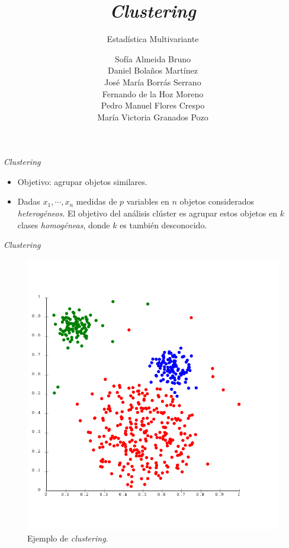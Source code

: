 \documentclass[spanish]{beamer}
\title{\textit{Clustering}}
\subtitle{Estadística Multivariante}
\author{Sofía Almeida Bruno\\ Daniel Bolaños Martínez\\ José María Borrás Serrano\\ Fernando de la Hoz Moreno\\ Pedro Manuel Flores Crespo\\ María Victoria Granados Pozo}
\begin{document}
\maketitle
	
\begin{frame}{\textit{Clustering}}
  \begin{itemize}
  \item Objetivo: agrupar objetos similares.\break
  \item Dadas \textbf{$x_1$}$,\cdots, $\textbf{$x_n$} medidas de $p$ variables en $n$ objetos considerados \textit{heterogéneos}. El objetivo del análisis clúster es agrupar estos objetos en $k$ clases \textit{homogéneas}, donde $k$ es también desconocido.
  \end{itemize}
\end{frame}

\begin{frame}{\textit{Clustering}}
\begin{figure}[H]
	\centering
	\includegraphics[scale=0.2]{ejemplo}
	\caption{Ejemplo de \textit{clustering}. \cite{chire_deutsch:_2011}}
	\label{fig:ejemplo1}
\end{figure}
\end{frame}
\end{document}
